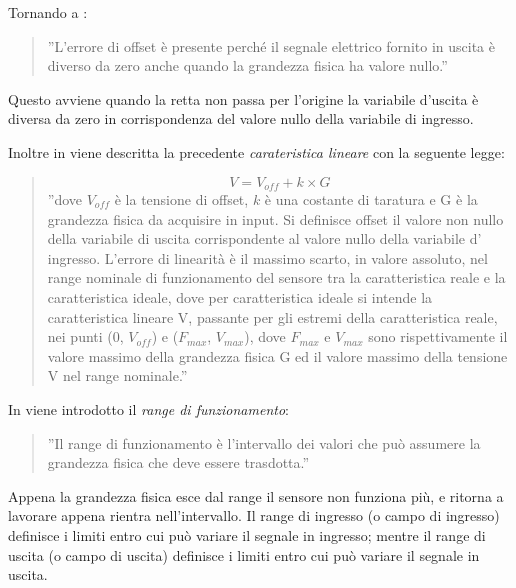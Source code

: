 \documentclass[a4paper]{report} %
\begin{document}
Tornando a \cite{art:rif.1}:
\begin{quote} 
	''L'errore di offset è presente perché il segnale elettrico fornito in uscita è diverso da zero anche quando la grandezza fisica ha valore nullo.'' 
\end{quote} 	
Questo avviene quando la retta non passa per l'origine la variabile d'uscita è diversa da zero in corrispondenza del valore nullo della variabile di ingresso. 

Inoltre in \cite{art:rif.1} viene descritta la precedente \textit{carateristica lineare} con la seguente legge: 
\begin{quote}
	\begin{equation}
	V = V_{off} + k \times G
	\end{equation}
	''dove $V_{off}$ è la tensione di offset, $k$ è una costante di taratura e G è la grandezza fisica da acquisire in input. Si definisce offset il valore non nullo della variabile di uscita corrispondente al valore nullo della variabile d' ingresso.
	L'errore di linearità è il massimo scarto, in valore assoluto, nel range nominale di funzionamento del sensore tra la caratteristica reale e la caratteristica ideale, dove per caratteristica ideale si intende la caratteristica lineare V, passante per gli estremi della caratteristica reale, nei punti (0, $V_{off}$) e ($F_{max}$, $V_{max}$), dove $F_{max}$ e $V_{max}$ sono rispettivamente il valore massimo della grandezza fisica G ed il valore massimo della tensione V nel range nominale.''
\end{quote}

In \cite{art:rif.11} viene introdotto il \textit{range di funzionamento}:
\begin{quote}
	''Il range di funzionamento è l'intervallo dei valori che può assumere la grandezza fisica che deve essere trasdotta.'' 
\end{quote}  	
Appena la grandezza fisica esce dal range il sensore non funziona più, e ritorna a lavorare appena rientra nell'intervallo. Il range di ingresso (o campo di ingresso) definisce i limiti entro cui può variare il segnale in ingresso; mentre il range di uscita (o campo di uscita) definisce i limiti entro cui può variare il segnale in uscita.
 
\end{document}
